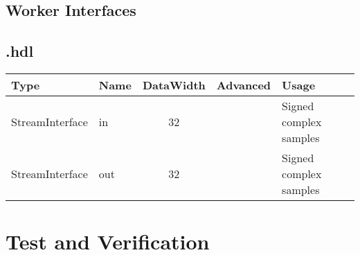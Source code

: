 \begin{landscape}
	\section*{Worker Interfaces}
	\subsection*{\comp.hdl}
	\begin{scriptsize}
		\begin{tabular}{|M{2cm}|M{1.5cm}|c|c|M{12cm}|}
			\hline
			Type            & Name & DataWidth & Advanced  & Usage                  \\
			\hline
			StreamInterface & in   & 32        & 			& Signed complex samples \\
			\hline
			StreamInterface & out  & 32        & 			& Signed complex samples \\
			\hline
		\end{tabular}
	\end{scriptsize}
\end{landscape}


\section*{Test and Verification}

